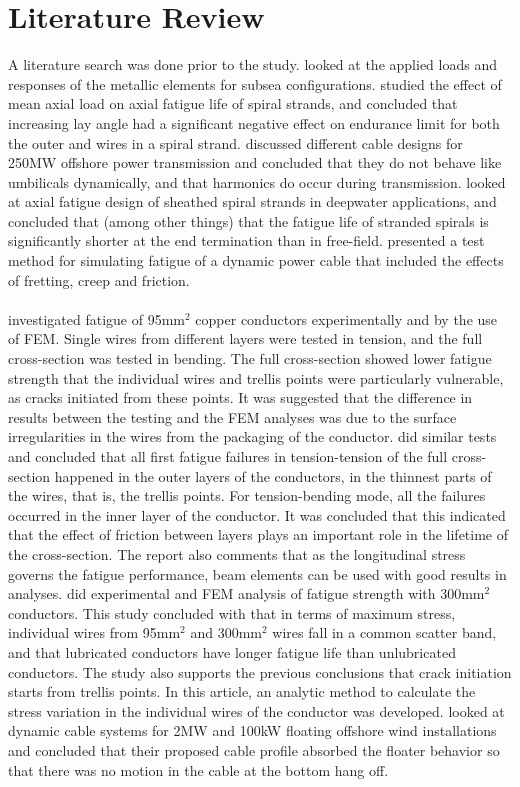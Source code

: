 \section{Literature Review}
A literature search was done prior to the study. \cite{Feld1995} looked at the applied loads and responses of the metallic elements for subsea configurations. \cite{Alani1997Eoma} studied the effect of mean axial load on axial fatigue life of spiral strands, and concluded that increasing lay angle had a significant negative effect on endurance limit for both the outer and wires in a spiral strand. \cite{Chien2004} discussed different cable designs for 250MW offshore power transmission and concluded that they do not behave like umbilicals dynamically, and that harmonics do occur during transmission. \cite{Raoof2008} looked at axial fatigue design of sheathed spiral strands in deepwater applications, and concluded that (among other things) that the fatigue life of stranded spirals is significantly shorter at the end termination than in free-field. \cite{Karlsen2010} presented a test method for simulating fatigue of a dynamic power cable that included the effects of fretting, creep and friction.\\\\ \cite{Nasution2013} investigated fatigue of 95mm$^2$ copper conductors experimentally and by the use of FEM. Single wires from different layers were tested in tension, and the full cross-section was tested in bending. The full cross-section showed lower fatigue strength that the individual wires and trellis points were particularly vulnerable, as cracks initiated from these points. It was suggested that the difference in results between the testing and the FEM analyses was due to the surface irregularities in the wires from the packaging of the conductor. \cite{NASUTION2014} did similar tests and concluded that all first fatigue failures in tension-tension of the full cross-section happened in the outer layers of the conductors, in the thinnest parts of the wires, that is, the trellis points. For tension-bending mode, all the failures occurred in the inner layer of the conductor. It was concluded that this indicated that the effect of friction between layers plays an important role in the lifetime of the cross-section. The report also comments that as the longitudinal stress governs the fatigue performance, beam elements can be used with good results in analyses. \cite{s300} did experimental and FEM analysis of fatigue strength with 300mm$^2$ conductors. This study concluded with that in terms of maximum stress, individual wires from 95mm$^2$  and 300mm$^2$ wires fall in a common scatter band, and that lubricated conductors have longer fatigue life than unlubricated conductors. The study also supports the previous conclusions that crack initiation starts from trellis points. In this article, an analytic method to calculate the stress variation in the individual wires of the conductor was developed. \cite{Taninok2017} looked at dynamic cable systems for 2MW and 100kW floating offshore wind installations and concluded that their proposed cable profile absorbed the floater behavior so that there was no motion in the cable at the bottom hang off.  

